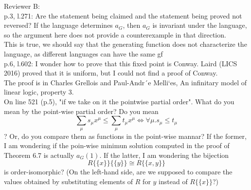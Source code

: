 \documentclass[11pt]{article}
\begin{document}
	
Reviewer B:\\
	
p.3, l.271: Are the statement being claimed and the statement being proved not reversed? If the language determines $a_G$, then $a_G$ is invariant under the language, so the argument here does not provide a counterexample in that direction.\\
This is true, we should say that the generating function does not characterize the language, as different languages can have the same gf\\
p.6, l.602: I wonder how to prove that this fixed point is Conway. Laird (LICS 2016) proved that it is uniform, but I could not find a proof of Conway.\\ 
The proof is in Charles Grellois and Paul-Andr´e Melli`es, An infinitary model of linear logic, property 3.\\

On line 521 (p.5), "if we take on it the pointwise partial order". What do you mean by the point-wise partial order? Do you mean 
$$ \sum_\mu s_{\mu} x^\mu \le \sum_\mu t_\mu x^\mu \Leftrightarrow \forall \mu. s_\mu \le t_\mu $$?  Or, do you compare them as functions in the point-wise mannar? If the former, I am wondering if the poin-wise minimun solution computed in the proof of Theorem 6.7 is actually $a_G(1)$. If the latter, I am wondering the bijection $$ R\{\{x\}\}\{\{y\}\} \cong R\{\{x,y\}\} $$ is order-isomorphic? (On the left-hand side, are we supposed to compare the values obtained by substituting elements of $R$ for $ y $ instead of $ R\{\{x\}\}$?)\\
\end{document}
